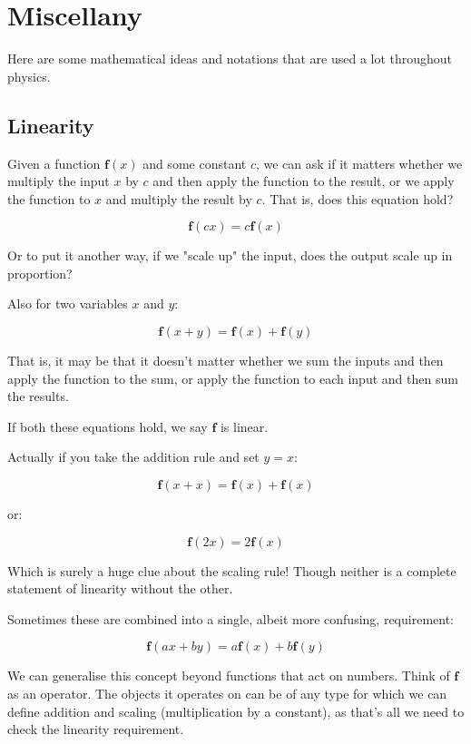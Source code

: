 \chapter{Miscellany}

Here are some mathematical ideas and notations that are used a lot throughout physics.

\section{Linearity} \label{sec:linearity}

Given a function $\mathbf{f}(x)$ and some constant $c$, we can ask if it matters whether we multiply the input $x$ by $c$ and then apply the function to the result, or we apply the function to $x$ and multiply the result by $c$. That is, does this equation hold?

$$\mathbf{f}(cx) = c\mathbf{f}(x)$$

Or to put it another way, if we "scale up" the input, does the output scale up in proportion?

Also for two variables $x$ and $y$:

$$\mathbf{f}(x + y) = \mathbf{f}(x) + \mathbf{f}(y)$$

That is, it may be that it doesn't matter whether we sum the inputs and then apply the function to the sum, or apply the function to each input and then sum the results.

If both these equations hold, we say $\mathbf{f}$ is linear.

Actually if you take the addition rule and set $y = x$:

$$\mathbf{f}(x + x) = \mathbf{f}(x) + \mathbf{f}(x)$$

or:

$$\mathbf{f}(2x) = 2\mathbf{f}(x)$$

Which is surely a huge clue about the scaling rule! Though neither is a complete statement of linearity without the other.

Sometimes these are combined into a single, albeit more confusing, requirement:

$$\mathbf{f}(ax + by) = a\mathbf{f}(x) + b\mathbf{f}(y)$$

We can generalise this concept beyond functions that act on numbers. Think of $\mathbf{f}$ as an operator. The objects it operates on can be of any type for which we can define addition and scaling (multiplication by a constant), as that's all we need to check the linearity requirement.

